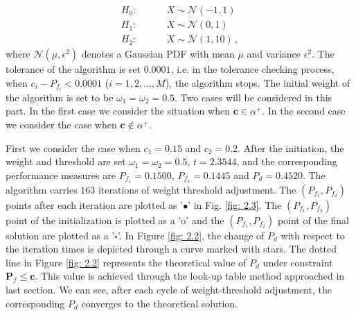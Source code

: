 \begin{equation}
\label{equ: Gaussian Hypothesis}
\begin{split}
	H_0:\;\;\;\;\;\;\;\;&X \sim \mathcal{N}(-1,1)\\
    H_1:\;\;\;\;\;\;\;\;&X \sim \mathcal{N}(0,1)\\
    H_2:\;\;\;\;\;\;\;\;&X \sim \mathcal{N}(1,10)\,,
\end{split}
\end{equation}
where $\mathcal{N}(\mu, \epsilon^2)$ denotes a Gaussian PDF with mean $\mu$ and variance $\epsilon^2$.
The tolerance of the algorithm is set $0.0001$, i.e. in the tolerance checking process, when $c_i - P_{f_i} < 0.0001$ ($i = 1, 2, ..., M$), the algorithm stops. The initial weight of the algorithm is set to be $\omega_1 = \omega_2 = 0.5$. 
Two cases will be considered in this part. In the first case we consider the situation when $\mathbf{c} \in \alpha^+$. In the second case we consider the case when $\mathbf{c} \notin \alpha^+$.

First we consider the case when $c_1 = 0.15$ and $c_2 = 0.2$.
After the initiation, the weight and threshold are set $\omega_1 = \omega_2 = 0.5$, $t =2.3544$, and the corresponding performance measures are $P_{f_1}  = 0.1500$, $P_{f_2} = 0.1445$ and $P_d = 0.4520$. The algorithm carries $163$ iterations of weight threshold adjustment. The $(P_{f_1}, P_{f_2})$  points after each iteration are plotted as '$\bullet$' in Fig. \ref{fig: 2.3}. 
The $(P_{f_1}, P_{f_2})$ point of the initialization is plotted as  a 'o' and the $(P_{f_1}, P_{f_2})$ point of the final solution are plotted as a '$\square$'. 
In Figure \ref{fig: 2.2}, the change of $P_d$ with respect to the iteration times is depicted through a curve marked with stars.   
The dotted line in Figure \ref{fig: 2.2} represents the theoretical value of $P_d$ under constraint $\mathbf{P}_f \leq \mathbf{c}$. This value is achieved through the look-up table method approached in last section. We can see, after each cycle of weight-threshold adjustment, the corresponding $P_d$ converges to the theoretical solution. 

